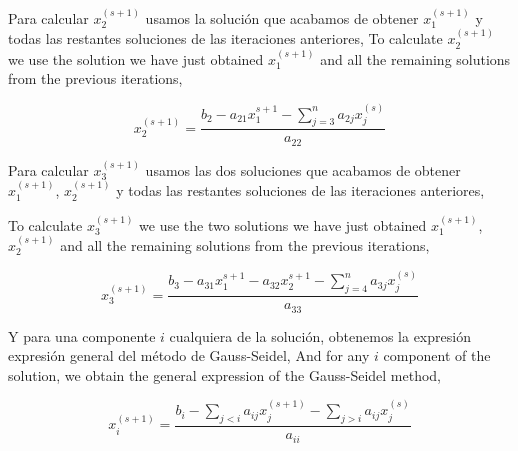\begin{paracol}{2}
Para calcular $x_2^{(s+1)}$ usamos la solución que acabamos de obtener  $x_1^{(s+1)}$ y todas las restantes soluciones de las iteraciones anteriores,
\switchcolumn
To calculate $x_2^{(s+1)}$ we use the solution we have just obtained $x_1^{(s+1)}$ and all the remaining solutions from the previous iterations,
\end{paracol}
\begin{equation*}
x_2^{(s+1)}=\frac{b_2-a_{21}x_1^{s+1}-\sum_{j=3}^na_{2j}x_j^{(s)}}{a_{22}}
\end{equation*}
\begin{paracol}{2}

Para calcular $x_3^{(s+1)}$ usamos las dos soluciones que acabamos de obtener  $x_1^{(s+1)}$, $x_2^{(s+1)}$ y todas las restantes soluciones de las iteraciones anteriores,
\switchcolumn

To calculate $x_3^{(s+1)}$ we use the two solutions we have just obtained $x_1^{(s+1)}$, $x_2^{(s+1)}$ and all the remaining solutions from the previous iterations,
\end{paracol}

\begin{equation*}
x_3^{(s+1)}=\frac{b_3-a_{31}x_1^{s+1}-a_{32}x_2^{s+1}-\sum_{j=4}^na_{3j}x_j^{(s)}}{a_{33}}
\end{equation*}
\begin{paracol}{2}
Y para una componente $i$ cualquiera de la solución, obtenemos la expresión expresión general del método de Gauss-Seidel,
\switchcolumn
And for any $i$ component of the solution, we obtain the general expression of the Gauss-Seidel method,
\end{paracol}
  
\begin{equation*}
x_i^{(s+1)}=\frac{b_i-\sum_{j< i}a_{ij}x_j^{(s+1)}-\sum_{j> i}a_{ij}x_j^{(s)}}{a_{ii}}
\end{equation*}

